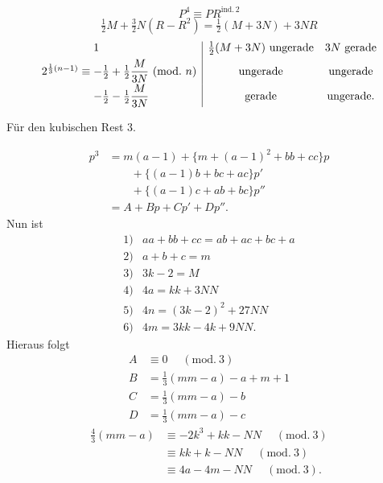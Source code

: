 \[P^4\equiv PR^{\mathrm{ind.}\,2}\]
\[\tfrac12 M+\tfrac32 N(R-R^2)=\tfrac12(M+3N)+3NR\]
\[\begin{array}{r@{}l|cc}
&1&\tfrac12(M+3N)\ \text{ungerade}&3N\ \text{gerade}\\[4pt]
2^{\frac13(n-1)}\equiv{}&-\tfrac12+\tfrac12\dfrac{M}{3N}\ (\mathrm{mod.}\ n)&\text{ungerade}&\text{ungerade}\\[5pt]
&-\tfrac12-\tfrac12\dfrac{M}{3N}&\text{gerade}&\text{ungerade.}
\end{array}\]
\begin{center}Für den kubischen Rest 3.\end{center}
\[\begin{aligned}
p^3&=m(a-1)+\{m+(a-1)^2+bb+cc\}p\\
&\qquad+\{(a-1)b+bc+ac\}p'\\
&\qquad+\{(a-1)c+ab+bc\}p''\\
&=A+Bp+Cp'+Dp''.
\end{aligned}\]
\noindent Nun ist
\[\begin{array}{rl}1)&aa+bb+cc=ab+ac+bc+a\\2)&a+b+c=m\\3)&3k-2=M\\4)&4a=kk+3NN\\5)&4n=(3k-2)^2+27NN\\6)&4m=3kk-4k+9NN.\end{array}\]
\noindent Hieraus folgt
\[\begin{aligned}A&\equiv0\quad\;(\mathrm{mod.}\ 3)\\ B&=\tfrac13(mm-a)-a+m+1\\ C&=\tfrac13(mm-a)-b\\D&=\tfrac13(mm-a)-c\end{aligned}\]
\[\begin{aligned}\tfrac43(mm-a)&\equiv-2k^3+kk-NN\quad\;(\mathrm{mod.}\ 3)\\
&\equiv kk+k-NN\quad\;(\mathrm{mod.}\ 3)\\
&\equiv4a-4m-NN\quad\;(\mathrm{mod.}\ 3).\end{aligned}\]
